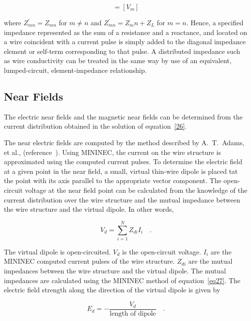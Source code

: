 \documentclass[12pt]{article}
\begin{document}
\begin{equation}
[Z^\prime_{mn}][I_n]=[V_m]
\label{eq31}
\end{equation}

where $Z^\prime_{mn}=Z_{mn}$ for $m\ne n$ and $Z^\prime_{mn}=Z_mn+Z_L$
for $m=n$. Hence, a specified impedance represented as the sum of a
resistance and a reactance, and located on a wire coincident with a
current pulse is simply added to the diagonal impedance element or
self-term corresponding to that pulse. A distributed impedance such as
wire conductivity can be treated in the same way by use of an
equivalent, lumped-circuit, element-impedance relationship.

\subsection{Near Fields}
The electric near fields and the magnetic near fields can be determined
from the current distribution obtained in the solution of
equation~\eqref{26}.

The near electric fields are computed by the method described by
A.~T.~Adams, et al., (reference~\cite{r12}). Using MININEC, the current
on the wire structure is approximated using the computed current pulses.
To determine the electric field at a given point in the near field, a
small, virtual thin-wire dipole is placed tat the point with its axis
parallel to the appropriate vector component. The open-circuit voltage
at the near field point can be calculated from the knowledge of the
current distribution over the wire structure and the mutual impedance
between the wire structure and the virtual dipole. In other words,

\begin{equation}
V_d = \sum_{i=1}^{N}Z_{di}I_i \quad.
\label{eq32}
\end{equation}

The virtual dipole is open-circuited. $V_d$ is the open-circuit voltage.
$I_i$ are the MININEC computed current pulses of the wire structure.
$Z_{di}$ are the mutual impedances between the wire structure and the
virtual dipole. The mutual impedances are calculated using the MININEC
method of equation~\eqref{eq27}. The electric field strength along the
direction of the virtual dipole is given by

\begin{equation}
E_d = -\frac{V_d}{\mbox{length of dipole}}\quad.
\label{eq33}
\end{equation}
\end{document}
